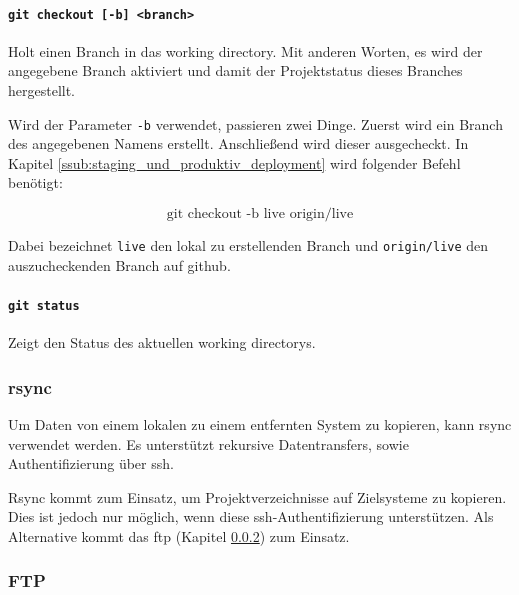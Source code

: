 \paragraph{\lstinline!git checkout [-b] <branch>!} %
\label{par:git_checkout}
Holt einen Branch in das \gls{working directory}. Mit anderen Worten, es wird der angegebene Branch aktiviert und damit der Projektstatus dieses Branches hergestellt.

Wird der Parameter \lstinline!-b! verwendet, passieren zwei Dinge. Zuerst wird ein Branch des angegebenen Namens erstellt. Anschließend wird dieser ausgecheckt. In Kapitel \ref{ssub:staging_und_produktiv_deployment} wird folgender Befehl benötigt:

\[
	\textrm{git checkout -b live origin/live}
\]

Dabei bezeichnet \lstinline!live! den lokal zu erstellenden Branch und \lstinline!origin/live! den aus\-zu\-check\-en\-den Branch auf \gls{github}.


\paragraph{\lstinline!git status!} %
\label{par:git_status}
Zeigt den Status des aktuellen \glspl{working directory}.


\subsubsection{rsync} %
\label{ssub:rsync}

Um Daten von einem lokalen zu einem entfernten System zu kopieren, kann rsync verwendet werden. Es unterstützt rekursive Datentransfers, sowie Authentifizierung über \gls{ssh}.

Rsync kommt zum Einsatz, um Projektverzeichnisse auf Zielsysteme zu kopieren. Dies ist jedoch nur möglich, wenn diese \gls{ssh}-Authentifizierung unterstützen. Als Alternative kommt das \gls{ftp} (Kapitel \ref{ssub:ftp}) zum Einsatz.


\subsubsection{FTP} %
\label{ssub:ftp}

